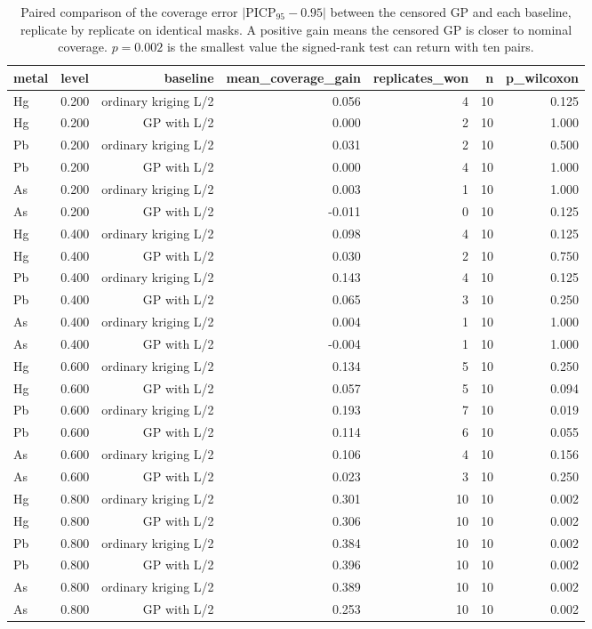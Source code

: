 \begin{table}[htbp]
\centering
\caption{Paired comparison of the coverage error $|\mathrm{PICP}_{95}-0.95|$ between the censored GP and each baseline, replicate by replicate on identical masks. A positive gain means the censored GP is closer to nominal coverage. $p=0.002$ is the smallest value the signed-rank test can return with ten pairs.}
\label{tab:covtest}
\footnotesize
\begin{tabular}{llrrrrr}
\toprule
metal & level & baseline & mean\_coverage\_gain & replicates\_won & n & p\_wilcoxon \\
\midrule
Hg & 0.200 & ordinary kriging L/2 & 0.056 & 4 & 10 & 0.125 \\
Hg & 0.200 & GP with L/2 & 0.000 & 2 & 10 & 1.000 \\
Pb & 0.200 & ordinary kriging L/2 & 0.031 & 2 & 10 & 0.500 \\
Pb & 0.200 & GP with L/2 & 0.000 & 4 & 10 & 1.000 \\
As & 0.200 & ordinary kriging L/2 & 0.003 & 1 & 10 & 1.000 \\
As & 0.200 & GP with L/2 & -0.011 & 0 & 10 & 0.125 \\
Hg & 0.400 & ordinary kriging L/2 & 0.098 & 4 & 10 & 0.125 \\
Hg & 0.400 & GP with L/2 & 0.030 & 2 & 10 & 0.750 \\
Pb & 0.400 & ordinary kriging L/2 & 0.143 & 4 & 10 & 0.125 \\
Pb & 0.400 & GP with L/2 & 0.065 & 3 & 10 & 0.250 \\
As & 0.400 & ordinary kriging L/2 & 0.004 & 1 & 10 & 1.000 \\
As & 0.400 & GP with L/2 & -0.004 & 1 & 10 & 1.000 \\
Hg & 0.600 & ordinary kriging L/2 & 0.134 & 5 & 10 & 0.250 \\
Hg & 0.600 & GP with L/2 & 0.057 & 5 & 10 & 0.094 \\
Pb & 0.600 & ordinary kriging L/2 & 0.193 & 7 & 10 & 0.019 \\
Pb & 0.600 & GP with L/2 & 0.114 & 6 & 10 & 0.055 \\
As & 0.600 & ordinary kriging L/2 & 0.106 & 4 & 10 & 0.156 \\
As & 0.600 & GP with L/2 & 0.023 & 3 & 10 & 0.250 \\
Hg & 0.800 & ordinary kriging L/2 & 0.301 & 10 & 10 & 0.002 \\
Hg & 0.800 & GP with L/2 & 0.306 & 10 & 10 & 0.002 \\
Pb & 0.800 & ordinary kriging L/2 & 0.384 & 10 & 10 & 0.002 \\
Pb & 0.800 & GP with L/2 & 0.396 & 10 & 10 & 0.002 \\
As & 0.800 & ordinary kriging L/2 & 0.389 & 10 & 10 & 0.002 \\
As & 0.800 & GP with L/2 & 0.253 & 10 & 10 & 0.002 \\
\bottomrule
\end{tabular}
\end{table}
